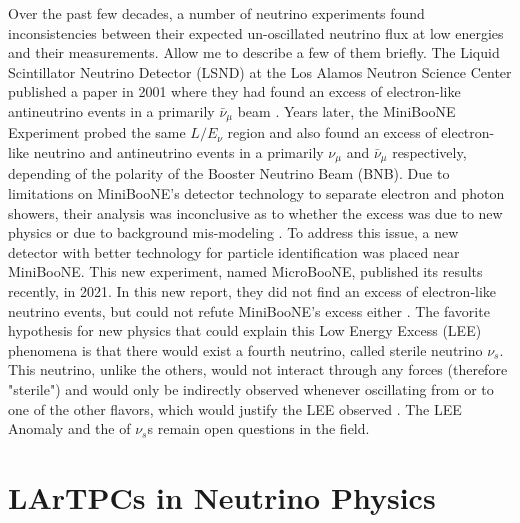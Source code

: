 Over the past few decades, a number of neutrino experiments found inconsistencies between their expected un-oscillated neutrino flux at low energies and their measurements. Allow me to describe a few of them briefly. The Liquid Scintillator Neutrino Detector (LSND) at the Los Alamos Neutron Science Center published a paper in 2001 where they had found an excess of electron-like antineutrino events in a primarily $\bar{\nu}_{\mu}$ beam \cite{lsnd}. Years later, the MiniBooNE Experiment probed the same $L/E_{\nu}$ region and also found an excess of electron-like neutrino and antineutrino events in a primarily $\nu_{\mu}$ and $\bar{\nu}_{\mu}$ respectively, depending of the polarity of the Booster Neutrino Beam (BNB). Due to limitations on MiniBooNE's detector technology to separate electron and photon showers, their analysis was inconclusive as to whether the excess was due to new physics or due to background mis-modeling \cite{miniboone}. To address this issue, a new detector with better technology for particle identification was placed near MiniBooNE. This new experiment, named MicroBooNE, published its results recently, in 2021. In this new report, they did not find an excess of electron-like neutrino events, but could not refute MiniBooNE's excess either \cite{microboone_lee}. The favorite hypothesis for new physics that could explain this Low Energy Excess (LEE) phenomena is that there would exist a fourth neutrino, called sterile neutrino $\nu_s$. This neutrino, unlike the others, would not interact through any forces (therefore "sterile") and would only be indirectly observed whenever oscillating from or to one of the other flavors, which would justify the LEE observed \cite{Lauren_thesis}. 
The LEE Anomaly and the of $\nu_s$s remain open questions in the field. 

\section{LArTPCs in Neutrino Physics}

